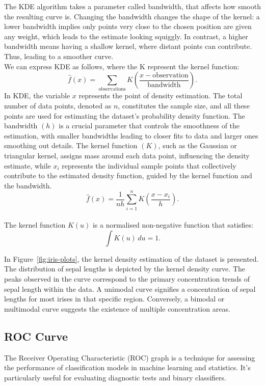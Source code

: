 \documentclass{article}\usepackage[]{graphicx}\usepackage[]{xcolor}
\numberwithin{equation}{section}
\begin{document}
\noindent
The KDE algorithm takes a parameter called bandwidth, that affects how smooth the resulting curve is. Changing the bandwidth changes the shape of the kernel: a lower bandwidth implies only points very close to the chosen position are given any weight, which leads to the estimate looking squiggly. In contrast, a higher bandwidth means having a shallow kernel, where distant points can contribute. Thus, leading to a smoother curve. %
\\

\noindent
We can express KDE as follows, where the K represent the kernel function:
$$\hat{f}(x) = \sum_{\text{observations}} K\left(\frac{x - \text{observation}}{\text{bandwidth}}\right).$$
In KDE, the variable $x$ represents the point of density estimation. The total number of data points, denoted as $n$, constitutes the sample size, and all these points are used for estimating the dataset's probability density function. The bandwidth $(h)$ is a crucial parameter that controls the smoothness of the estimation, with smaller bandwidths leading to closer fits to data and larger ones smoothing out details. The kernel function $(K)$, such as the Gaussian or triangular kernel, assigns mass around each data point, influencing the density estimate, while $x_i$ represents the individual sample points that collectively contribute to the estimated density function, guided by the kernel function and the bandwidth\cite{wand1994kernel}.
$$\hat{f}(x) = \frac{1}{nh} \sum_{i=1}^{n} K\left(\frac{x - x_i}{h}\right).$$\\
The kernel function \( K(u) \) is a normalised non-negative function that satisfies:
\[ \int K(u) \, du = 1. \]

\noindent In Figure~\ref{fig:iris-plots}, the kernel density estimation of the dataset is presented. The distribution of sepal lengths is depicted by the kernel density curve. The peaks observed in the curve correspond to the primary concentration trends of sepal length within the data. A unimodal curve signifies a concentration of sepal lengths for most irises in that specific region. Conversely, a bimodal or multimodal curve suggests the existence of multiple concentration areas.

\subsection{ROC Curve}

The Receiver Operating Characteristic (ROC) graph is a technique for assessing the performance of classification models in machine learning and statistics. It's particularly useful for evaluating diagnostic tests and binary classifiers.\\ 
\end{document}
